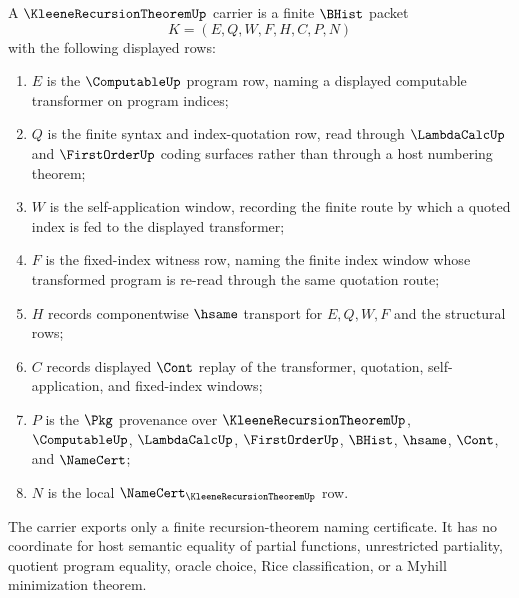 \begin{definition}
\label{def:kleene-recursion-theorem-carrier}
A $\KleeneRecursionTheoremUp$ carrier is a finite $\BHist$ packet
$$
K=(E,Q,W,F,H,C,P,N)
$$
with the following displayed rows:
\begin{enumerate}
\item $E$ is the $\ComputableUp$ program row, naming a displayed computable transformer on program indices;
\item $Q$ is the finite syntax and index-quotation row, read through $\LambdaCalcUp$ and $\FirstOrderUp$ coding surfaces rather than through a host numbering theorem;
\item $W$ is the self-application window, recording the finite route by which a quoted index is fed to the displayed transformer;
\item $F$ is the fixed-index witness row, naming the finite index window whose transformed program is re-read through the same quotation route;
\item $H$ records componentwise $\hsame$ transport for $E,Q,W,F$ and the structural rows;
\item $C$ records displayed $\Cont$ replay of the transformer, quotation, self-application, and fixed-index windows;
\item $P$ is the $\Pkg$ provenance over $\KleeneRecursionTheoremUp$, $\ComputableUp$, $\LambdaCalcUp$, $\FirstOrderUp$, $\BHist$, $\hsame$, $\Cont$, and $\NameCert$;
\item $N$ is the local $\NameCert_{\KleeneRecursionTheoremUp}$ row.
\end{enumerate}
The carrier exports only a finite recursion-theorem naming certificate. It has no coordinate for host semantic equality of partial functions, unrestricted partiality, quotient program equality, oracle choice, Rice classification, or a Myhill minimization theorem.
\end{definition}


